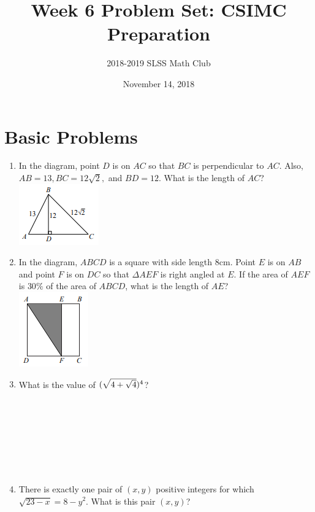 \documentclass[12pt]{article}
\title{Week 6 Problem Set: CSIMC Preparation\vspace{-3mm}}
\author{2018-2019 SLSS Math Club\vspace{-5mm}}
\date{November 14, 2018\vspace{-5mm}}
\newcommand{\bspace}{\\ \\ \\ \\ \\ \\ \\ \\}
\begin{document}
\maketitle

\section*{Basic Problems}
\begin{enumerate}
    \item In the diagram, point $D$ is on $AC$ so that $BC$ is perpendicular to $AC$. Also, $AB = 13, BC = 12\sqrt{2},$ and $BD=12$. What is the length of $AC$? \\ \includegraphics[scale = 1.85]{Graphics/Week_6/d2.PNG}
    
    \item In the diagram, $ABCD$ is a square with side length $8$cm. Point $E$ is on $AB$ and point $F$ is on $DC$ so that $\Delta AEF$ is right angled at $E$. If the area of $AEF$ is $30\%$ of the area of $ABCD$, what is the length of $AE$? \\ \includegraphics[scale = 1.85]{Graphics/Week_6/d1.PNG}
    
    \item What is the value of $\Large(\sqrt{4 + \sqrt{4}} \Large)^4$? \bspace
    
    \item There is exactly one pair of $(x, y)$ positive integers for which $\sqrt{23 - x} = 8 - y^2$. What is this pair $(x, y)$?
\end{enumerate} \newpage
\end{document}
